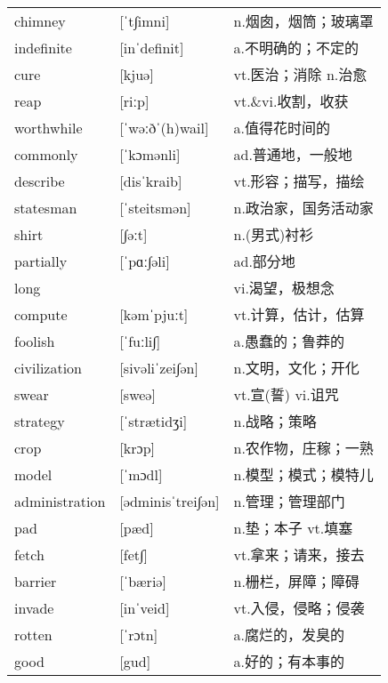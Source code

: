 \documentclass[a4paper]{article}
\begin{document}
\section{}
\begin{tabular}{l l l}

chimney & [ˈt∫imni] & n.烟囱，烟筒；玻璃罩 \\
indefinite & [inˈdefinit] & a.不明确的；不定的 \\
cure & [kjuə] & vt.医治；消除 n.治愈 \\
reap & [riːp] & vt.\&vi.收割，收获 \\
worthwhile & [ˈwəːðˈ(h)wail] & a.值得花时间的 \\
commonly & [ˈkɔmənli] & ad.普通地，一般地 \\
describe & [disˈkraib] & vt.形容；描写，描绘 \\
statesman & [ˈsteitsmən] & n.政治家，国务活动家 \\
shirt & [∫əːt] & n.(男式)衬衫 \\
partially & [ˈpɑː∫əli] & ad.部分地 \\
long &  & vi.渴望，极想念 \\
compute & [kəmˈpjuːt] & vt.计算，估计，估算 \\
foolish & [ˈfuːli∫] & a.愚蠢的；鲁莽的 \\
civilization & [sivəliˈzei∫ən] & n.文明，文化；开化 \\
swear & [sweə] & vt.宣(誓) vi.诅咒 \\
strategy & [ˈstrætidʒi] & n.战略；策略 \\
crop & [krɔp] & n.农作物，庄稼；一熟 \\
model & [ˈmɔdl] & n.模型；模式；模特儿 \\
administration & [ədminisˈtrei∫ən] & n.管理；管理部门 \\
pad & [pæd] & n.垫；本子 vt.填塞 \\
fetch & [fet∫] & vt.拿来；请来，接去 \\
barrier & [ˈbæriə] & n.栅栏，屏障；障碍 \\
invade & [inˈveid] & vt.入侵，侵略；侵袭 \\
rotten & [ˈrɔtn] & a.腐烂的，发臭的 \\
good & [gud] & a.好的；有本事的 \\

\end{tabular}
\end{document}
